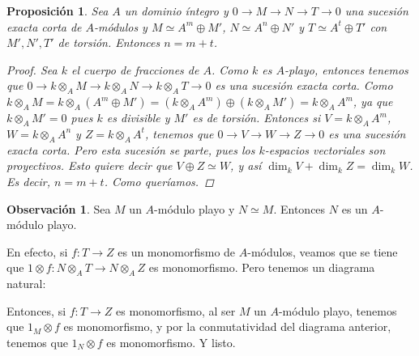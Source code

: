 \documentclass[12pt]{book}
\newtheorem{prop}[teo]{Proposición}
\theoremstyle{definition}
\newtheorem{obs}[teo]{Observación}
\begin{document}
\begin{prop}
Sea $A$ un dominio íntegro y $0\longrightarrow M\longrightarrow N\longrightarrow T\longrightarrow 0$ una sucesión exacta corta de $A$-módulos y $M\simeq A^m\oplus M'$, $N\simeq A^n \oplus N'$ y $T\simeq A^t\oplus T'$ con $M',N',T'$ de torsión. Entonces $n=m+t$.
\begin{proof}
Sea $k$ el cuerpo de fracciones de $A$. Como $k$ es $A$-playo, entonces tenemos que $0\longrightarrow k\otimes_A M\longrightarrow k\otimes_A N\longrightarrow k\otimes_A T\longrightarrow 0$ es una sucesión exacta corta. Como $k\otimes_A M = k\otimes_A (A^m\oplus M') = (k\otimes_A A^m)\oplus (k\otimes_A M') = k\otimes_A A^m$, ya que $k\otimes_A M'=0$ pues $k$ es divisible y $M'$ es de torsión. Entonces si $V=k\otimes_A A^m$, $W=k\otimes_A A^n$ y $Z=k\otimes_A A^t$, tenemos que $0\longrightarrow V\longrightarrow W\longrightarrow Z\longrightarrow 0$ es una sucesión exacta corta. Pero esta sucesión se parte, pues los $k$-espacios vectoriales son proyectivos. Esto quiere decir que $V\oplus Z \simeq W$, y así $\dim_k V + \dim_k Z = \dim_k W$. Es decir, $n = m+t$. Como queríamos.
\end{proof}
\end{prop}

\begin{obs}
Sea $M$ un $A$-módulo playo y $N\simeq M$. Entonces $N$ es un $A$-módulo playo.

En efecto, si $f:T\to Z$ es un monomorfismo de $A$-módulos, veamos que se tiene que $1\otimes f:N\otimes_A T\to N\otimes_A Z$ es monomorfismo. Pero tenemos un diagrama natural: \begin{center}\end{center}
Entonces, si $f:T\to Z$ es monomorfismo, al ser $M$ un $A$-módulo playo, tenemos que $1_M\otimes f$ es monomorfismo, y por la conmutatividad del diagrama anterior, tenemos que $1_N\otimes f$ es monomorfismo. Y listo.
\end{obs}
\end{document}
